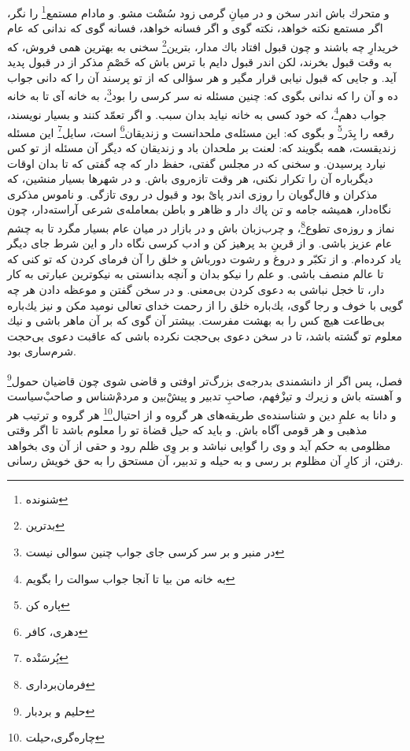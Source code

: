 و متحرك باش اندر سخن و در ميانِ گرمى زود سُسْت مشو. و مادام مستمع\footnote{شنونده} را نگر، اگر مستمع نكته خواهد، نكته گوى و اگر فسانه خواهد، فسانه گوى كه ندانى كه عام خريدارِ چه باشند و چون قبول افتاد باك مدار، بترين\footnote{بدترین} سخنى به بهترين همى فروش، كه به وقت قبول بخرند، لكن اندر قبول دايم با ترس باش كه خَصْمِ مذكر از در قبول پديد آيد. و جايى كه قبول نيابى قرار مگير و هر سؤالى كه از تو پرسند آن را كه دانى جواب ده و آن را كه ندانى بگوى كه: چنين مسئله نه سر كرسى را بود\footnote{در منبر و بر سر کرسی جای جواب چنین سوالی نیست}، به خانه آى تا به خانه جواب دهم\footnote{به خانه‌ من بیا تا آنجا جواب سوالت را بگویم}، كه خود كسى به خانه نيايد بدان سبب. و اگر تعمّد كنند و بسيار نويسند، رقعه را بِدَر\footnote{پاره کن} و بگوى كه: اين مسئله‌ی ملحدانست و زنديقان\footnote{دهری، کافر} است، سايل\footnote{پُرسَنْده} اين مسئله زنديقست، همه بگويند كه: لعنت بر ملحدان باد و زنديقان كه ديگر آن مسئله از تو كس نيارد پرسيدن. و سخنى كه در مجلس گفتى، حفظ‌ دار كه چه گفتى كه تا بدان اوقات ديگرباره آن را تكرار نكنى، هر وقت تازه‌روى باش. و در شهرها بسيار منشين، كه مذكران و فال‌گويان را روزى اندر پایْ بود و قبول در روى تازگى. و ناموس مذكرى نگاه‌دار، هميشه جامه و تن پاك‌ دار و ظاهر و باطن بمعامله‌ی شرعى آراسته‌دار، چون نماز و روزه‌ی تطوع\footnote{فرمان‌برداری}، و چرب‌زبان باش و در بازار در ميان عام بسيار مگرد تا به چشم عام عزيز باشى. و از قرينِ بد پرهيز كن و ادب كرسى نگاه دار و اين شرط جاى ديگر ياد كرده‌ام. و از تكبّر و دروغ و رشوت دورباش و خلق را آن فرماى كردن كه تو كنى كه تا عالم منصف باشى. و علم را نيكو بدان و آنچه بدانستى به نيكوترين عبارتى به كار دار، تا خجل نباشى به دعوى كردن بى‌معنى. و در سخن گفتن و موعظه دادن هر چه گويى با خوف و رجا گوى، يك‌باره خلق را از رحمت خداى تعالى نوميد مكن و نيز يك‌باره بى‌طاعت هيچ كس را به بهشت مفرست. بيشتر آن گوى كه بر آن ماهر باشى و نيك معلوم تو گشته باشد، تا در سخن دعوى بى‌حجت نكرده باشى كه عاقبت دعوى بى‌حجت شرم‌سارى بود.

فصل، پس اگر از دانشمندى بدرجه‌ی بزرگ‌تر اوفتى و قاضى شوى چون قاضيان حمول\footnote{حلیم و بردبار} و آهسته باش و زيرك و تيزْفهم، صاحبِ‌ تدبير و پيشْ‌بين و مردمْ‌شناس و صاحبْ‌سياست و دانا به علمِ دين و شناسنده‌ی طريقه‌هاى هر گروه و از احتيال\footnote{چاره‌گری،‌حیلت} هر گروه و ترتيب هر مذهبى و هر قومى آگاه باش. و بايد كه حيل قضاة تو را معلوم باشد تا اگر وقتى مظلومى به حكم آيد و وى را گوايى نباشد و بر وِى ظلم رود و حقى از آن وى بخواهد رفتن، از كارِ آن مظلوم بر رسى و به حيله و تدبير، آن مستحق را به حق خويش رسانى.

